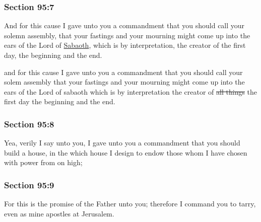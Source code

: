 	\subsubsection{Section 95:7} %
		\label{DC95-7}

		And for this cause I gave unto you a commandment that you should call your solemn assembly, that your fastings and your mourning might come up into the ears of the Lord of \hyperref[SABAOTH]{Sabaoth}, which is by interpretation, the creator of the first day, the beginning and the end.

		\begin{framed}
		\scriptsize
			\begin{compactdesc}
				\item[JSP] and for this cause I gave unto you a commandment that you should call your solem assembly that your fastings and your mourning might come up into the ears of the Lord of sabaoth which is by interpretation the creator of \sout{all things} the first day the beginning and the end.
			\end{compactdesc}
		\end{framed}

	\subsubsection{Section 95:8} %
		\label{DC95-8}

		Yea, verily I say unto you, I gave unto you a commandment that you should build a house, in the which house I design to endow those whom I have chosen with power from on high;


	\subsubsection{Section 95:9} %
		\label{DC95-9}

		For this is the promise of the Father unto you; therefore I command you to tarry, even as mine apostles at Jerusalem.

